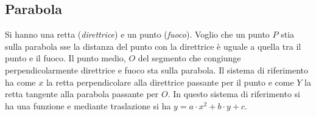 \documentclass[a4paper,12pt, oneside]{book}
\begin{document}
\subsection{Parabola}
\begin{definizione}
	Si hanno una retta (\textit{direttrice}) e un punto (\textit{fuoco}). Voglio che un punto $P$ stia sulla parabola sse la distanza del punto con la direttrice è uguale a quella tra il punto e il fuoco. Il punto medio, $O$ del segmento che congiunge perpendicolarmente direttrice e fuoco sta sulla parabola. Il sistema di riferimento ha come $x$ la retta perpendicolare alla direttrice passante per il punto e come $Y$ la retta tangente alla parabola passante per $O$. In questo sistema di riferimento si ha una funzione e mediante traslazione si ha $y=a\cdot x^2+b\cdot y+c$.\\
	~
\end{definizione}
\end{document}
